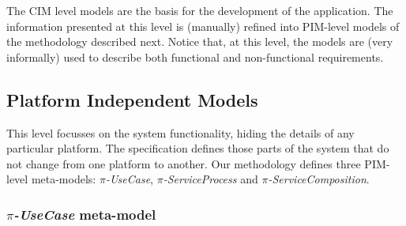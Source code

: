 The CIM level models are the basis for the development of the application. 
The information presented at this level is (manually) refined into PIM-level models of the methodology \pisodm described next.
Notice that, at this level, the models are (very informally) used to describe both functional and non-functional requirements.

\subsection{Platform Independent Models}

This level focusses on the system functionality, hiding the details of any particular platform.
The specification defines those parts of the system that do not change from one platform to another. 
Our methodology defines three PIM-level meta-models: \textit{$\pi$-UseCase}, \textit{$\pi$-ServiceProcess} and \textit{$\pi$-ServiceComposition}.
 
\subsubsection{\textit{$\pi$-UseCase} meta-model}%

